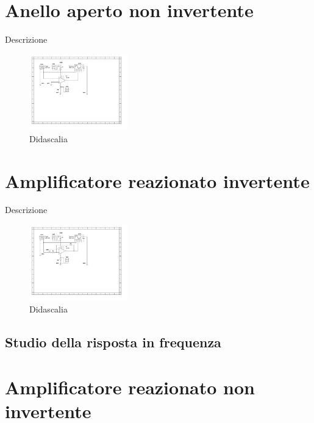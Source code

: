 \documentclass[journal]{IEEEtran}
\begin{document}
\section{\textbf{Anello aperto non invertente}} %
Descrizione

\begin{figure}[H]%
\begin {center}
\includegraphics[width=0.38\textwidth]{sch-simulations/output/OPA-open-loop-non-inverting.pdf}
\caption{Didascalia}
\label{fig:oscilloscope}
\end {center}
\end{figure}


\section{\textbf{Amplificatore reazionato invertente}} %
Descrizione

\begin{figure}[H]%
\begin {center}
\includegraphics[width=0.38\textwidth]{sch-simulations/output/OPA-closed-loop-inverting.pdf}
\caption{Didascalia}
\label{fig:oscilloscope}
\end {center}
\end{figure}

\subsection{Studio della risposta in frequenza}


\section{\textbf{Amplificatore reazionato non invertente}} %
\end{document}
